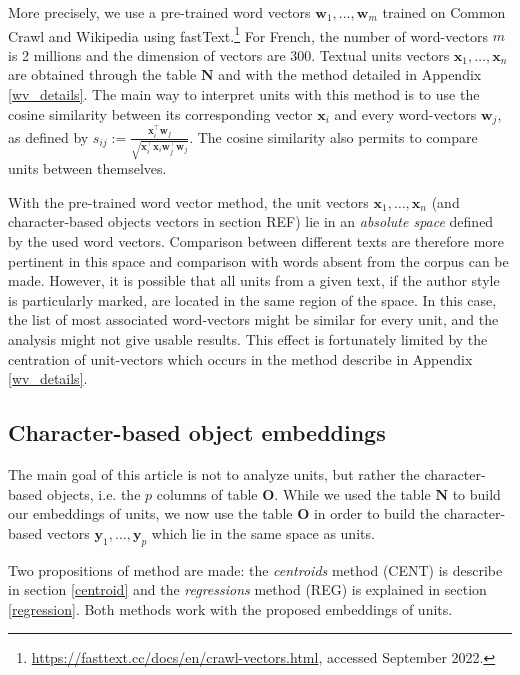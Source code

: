 \documentclass[
twocolumn,
]{ceurart}
\begin{document}
More precisely, we use a pre-trained word vectors $\mathbf{w}_1, \ldots, \mathbf{w}_m$ trained on Common Crawl and Wikipedia using fastText.\footnote{\url{ https://fasttext.cc/docs/en/crawl-vectors.html}, accessed September 2022.} For French, the number of word-vectors $m$ is 2 millions and the dimension of vectors are $300$. Textual units vectors $\mathbf{x}_1, \ldots, \mathbf{x}_n$ are obtained through the table $\mathbf{N}$ and with the method detailed in Appendix \ref{wv_details}. The main way to interpret units with this method is to use the cosine similarity between its corresponding vector $\mathbf{x}_i$ and every word-vectors $\mathbf{w}_j$, as defined by $s_{ij} := \frac{\mathbf{x}_i^\top \mathbf{w}_j}{\sqrt{\mathbf{x}_i^\top \mathbf{x}_i \mathbf{w}_j^\top \mathbf{w}_j}}$. The cosine similarity also permits to compare units between themselves.

With the pre-trained word vector method, the unit vectors $\mathbf{x}_1, \ldots, \mathbf{x}_n$ (and character-based objects vectors in section REF) lie in an \emph{absolute space} defined by the used word vectors. Comparison between different texts are therefore more pertinent in this space and comparison with words absent from the corpus can be made. However, it is possible that all units from a given text, if the author style is particularly marked, are located in the same region of the space. In this case, the list of most associated word-vectors might be similar for every unit, and the analysis might not give usable results. This effect is fortunately limited by the centration of unit-vectors which occurs in the method describe in Appendix \ref{wv_details}.

\subsection{Character-based object embeddings}

The main goal of this article is not to analyze units, but rather the character-based objects, i.e. the $p$ columns of table $\mathbf{O}$. While we used the table $\mathbf{N}$ to build our embeddings of units, we now use the table $\mathbf{O}$ in order to build the character-based vectors $\mathbf{y}_1, \ldots, \mathbf{y}_p$ which lie in the same space as units. 

Two propositions of method are made: the \emph{centroids} method (CENT) is describe in section \ref{centroid} and the \emph{regressions} method (REG) is explained in section \ref{regression}. Both methods work with the proposed embeddings of units.
\end{document}

